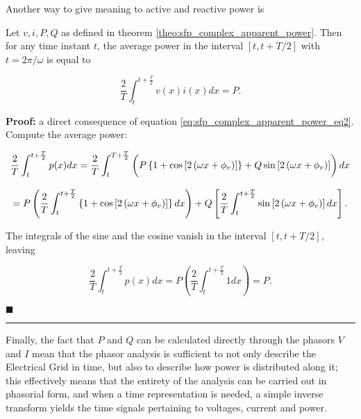 	Another way to give meaning to active and reactive power is

\begin{corollary}\label{corollary:sfp_active_average_power} %
	Let $v,i,P,Q$ as defined in theorem \ref{theo:sfp_complex_apparent_power}. Then for any time instant $t$, the average power in the interval $\left[t,t+T/2\right]$ with $t = 2\pi/\omega$ is equal to

\begin{equation} \dfrac{2}{T} \int_{t}^{t + \frac{T}{2}} v(x)i(x)dx = P .\end{equation}
\end{corollary}
\textbf{Proof:} a direct consequence of equation \eqref{eq:sfp_complex_apparent_power_eq2}. Compute the average power:

\begin{gather}
	\dfrac{2}{T} \int_{t}^{t + \frac{T}{2}} p(x)dx = \dfrac{2}{T}\int_{t}^{T + \frac{T}{2}} \left(\raisebox{5mm}{} P\left\{1 + \cos\left[2\left(\omega x + \phi_v\right) \right]\right\} + Q\sin\left[2\left(\omega x + \phi_v \right)\right]\right)dx \nonumber\\[3mm]
	= P \left(\dfrac{2}{T}\int_{t}^{t + \frac{T}{2}} \left\{1 + \cos\left[2\left(\omega x + \phi_v\right) \right]\right\}dx\right) + Q\left[ \dfrac{2}{T} \int_{t}^{t + \frac{T}{2}} \sin\left[2\left(\omega x + \phi_v \right)\right]dx \right] .
\end{gather}

	The integrals of the sine and the cosine vanish in the interval $\left[t,t +T/2\right]$, leaving

\begin{equation} \dfrac{2}{T} \int_{t}^{t + \frac{T}{2}} p(x)dx = P \left(\dfrac{2}{T}\int_{t}^{t + \frac{T}{2}} 1dx\right) = P .\end{equation}

\hfill$\blacksquare$

\vspace{5mm}
\hrule
\vspace{5mm} %

	Finally, the fact that $P$ and $Q$ can be calculated directly through the phasors $V$ and $I$ mean that the phasor analysis is sufficient to not only describe the Electrical Grid in time, but also to describe how power is distributed along it; this effectively means that the entirety of the analysis can be carried out in phasorial form, and when a time representation is needed, a simple inverse transform yields the time signals pertaining to voltages, current and power.


